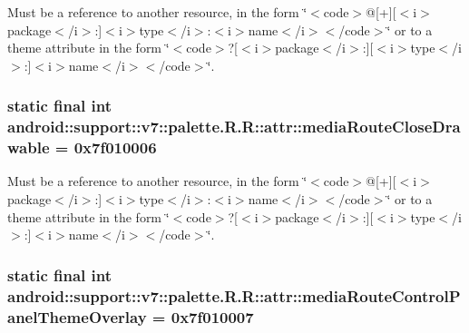 Must be a reference to another resource, in the form \char`\"{}$<$code$>$@\mbox{[}+\mbox{]}\mbox{[}$<$i$>$package$<$/i$>$:\mbox{]}$<$i$>$type$<$/i$>$:$<$i$>$name$<$/i$>$$<$/code$>$\char`\"{} or to a theme attribute in the form \char`\"{}$<$code$>$?\mbox{[}$<$i$>$package$<$/i$>$:\mbox{]}\mbox{[}$<$i$>$type$<$/i$>$:\mbox{]}$<$i$>$name$<$/i$>$$<$/code$>$\char`\"{}. \hypertarget{classandroid_1_1support_1_1v7_1_1palette_1_1_r_1_1attr_f3f60f4c7d6b82a9ef9a98a368e6a865}{
\subsubsection[{mediaRouteCloseDrawable}]{\setlength{\rightskip}{0pt plus 5cm}static final int android::support::v7::palette.R.R::attr::mediaRouteCloseDrawable = 0x7f010006}}
\label{classandroid_1_1support_1_1v7_1_1palette_1_1_r_1_1attr_f3f60f4c7d6b82a9ef9a98a368e6a865}


Must be a reference to another resource, in the form \char`\"{}$<$code$>$@\mbox{[}+\mbox{]}\mbox{[}$<$i$>$package$<$/i$>$:\mbox{]}$<$i$>$type$<$/i$>$:$<$i$>$name$<$/i$>$$<$/code$>$\char`\"{} or to a theme attribute in the form \char`\"{}$<$code$>$?\mbox{[}$<$i$>$package$<$/i$>$:\mbox{]}\mbox{[}$<$i$>$type$<$/i$>$:\mbox{]}$<$i$>$name$<$/i$>$$<$/code$>$\char`\"{}. \hypertarget{classandroid_1_1support_1_1v7_1_1palette_1_1_r_1_1attr_dc083431f48f67f5e434fee55598f2c0}{
\subsubsection[{mediaRouteControlPanelThemeOverlay}]{\setlength{\rightskip}{0pt plus 5cm}static final int android::support::v7::palette.R.R::attr::mediaRouteControlPanelThemeOverlay = 0x7f010007}}
\label{classandroid_1_1support_1_1v7_1_1palette_1_1_r_1_1attr_dc083431f48f67f5e434fee55598f2c0}


